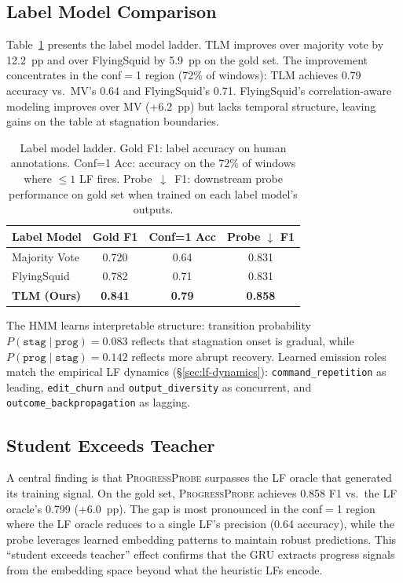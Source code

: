 \documentclass[11pt,a4paper]{article}
\newcommand{\ours}{\textsc{ProgressProbe}}
\newcommand{\tlm}{\textsc{TLM}}
\begin{document}
\subsection{Label Model Comparison}
\label{sec:label-models}

Table~\ref{tab:label-ladder} presents the label model ladder. \tlm{} improves over majority vote by 12.2~pp and over FlyingSquid by 5.9~pp on the gold set. The improvement concentrates in the conf$=$1 region (72\% of windows): \tlm{} achieves 0.79 accuracy vs.\ MV's 0.64 and FlyingSquid's 0.71. FlyingSquid's correlation-aware modeling improves over MV (+6.2~pp) but lacks temporal structure, leaving gains on the table at stagnation boundaries.

\begin{table}[t]
\centering
\small
\begin{tabular}{lccc}
\toprule
\textbf{Label Model} & \textbf{Gold F1} & \textbf{Conf=1 Acc} & \textbf{Probe $\downarrow$ F1} \\
\midrule
Majority Vote & 0.720 & 0.64 & 0.831 \\
FlyingSquid & 0.782 & 0.71 & 0.831 \\
\textbf{\tlm{} (Ours)} & \textbf{0.841} & \textbf{0.79} & \textbf{0.858} \\
\bottomrule
\end{tabular}
\caption{Label model ladder. Gold F1: label accuracy on human annotations. Conf=1 Acc: accuracy on the 72\% of windows where $\leq 1$ LF fires. Probe~$\downarrow$~F1: downstream probe performance on gold set when trained on each label model's outputs.}
\label{tab:label-ladder}
\end{table}

The HMM learns interpretable structure: transition probability $P(\texttt{stag}\!\mid\!\texttt{prog}) = 0.083$ reflects that stagnation onset is gradual, while $P(\texttt{prog}\!\mid\!\texttt{stag}) = 0.142$ reflects more abrupt recovery. Learned emission roles match the empirical LF dynamics (\S\ref{sec:lf-dynamics}): \texttt{command\_repetition} as leading, \texttt{edit\_churn} and \texttt{output\_diversity} as concurrent, and \texttt{outcome\_backpropagation} as lagging.

\subsection{Student Exceeds Teacher}
\label{sec:student-teacher}

A central finding is that \ours{} surpasses the LF oracle that generated its training signal. On the gold set, \ours{} achieves 0.858 F1 vs.\ the LF oracle's 0.799 (+6.0~pp). The gap is most pronounced in the conf$=$1 region where the LF oracle reduces to a single LF's precision (0.64 accuracy), while the probe leverages learned embedding patterns to maintain robust predictions. This ``student exceeds teacher'' effect confirms that the GRU extracts progress signals from the embedding space beyond what the heuristic LFs encode.
\end{document}
